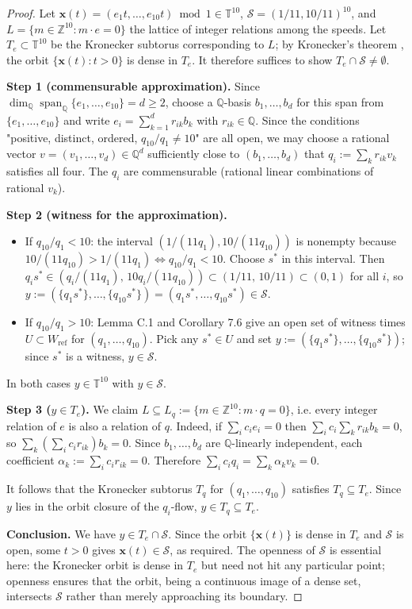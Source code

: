 \documentclass[12pt]{article}
\begin{document}
\begin{proof}
Let $\mathbf{x}(t)=(e_1t,\ldots,e_{10}t)\bmod 1\in\mathbb{T}^{10}$,
$\mathcal{S}=(1/11,10/11)^{10}$, and
$L=\{m\in\mathbb{Z}^{10}:m\cdot e=0\}$ the lattice of integer relations among the speeds.
Let $T_e\subset\mathbb{T}^{10}$ be the Kronecker subtorus corresponding to $L$; by
Kronecker's theorem \cite{KN74}, the orbit $\{\mathbf{x}(t):t>0\}$ is dense in $T_e$.
It therefore suffices to show $T_e\cap\mathcal{S}\ne\emptyset$.

\textbf{Step 1 (commensurable approximation).}
Since $\dim_{\mathbb{Q}}\operatorname{span}_{\mathbb{Q}}\{e_1,\ldots,e_{10}\}=d\ge 2$,
choose a $\mathbb{Q}$-basis $b_1,\ldots,b_d$ for this span from $\{e_1,\ldots,e_{10}\}$
and write $e_i=\sum_{k=1}^d r_{ik}b_k$ with $r_{ik}\in\mathbb{Q}$.
Since the conditions "positive, distinct, ordered, $q_{10}/q_1\ne 10$" are all open,
we may choose a rational vector $v=(v_1,\ldots,v_d)\in\mathbb{Q}^d$ sufficiently close
to $(b_1,\ldots,b_d)$ that $q_i:=\sum_k r_{ik}v_k$ satisfies all four. The $q_i$ are
commensurable (rational linear combinations of rational $v_k$).

\textbf{Step 2 (witness for the approximation).}
\begin{itemize}
\item If $q_{10}/q_1<10$: the interval $(1/(11q_1),10/(11q_{10}))$ is nonempty because
  $10/(11q_{10})>1/(11q_1)\iff q_{10}/q_1<10$. Choose $s^*$ in this interval. Then
  $q_is^*\in(q_i/(11q_1),\,10q_i/(11q_{10}))\subset(1/11,\,10/11)\subset(0,1)$ for
  all $i$, so $y:=(\{q_1s^*\},\ldots,\{q_{10}s^*\})=(q_1s^*,\ldots,q_{10}s^*)\in\mathcal{S}$.
\item If $q_{10}/q_1>10$: Lemma C.1 and Corollary 7.6 give an open set of witness times
  $U\subset W_{\mathrm{ref}}$ for $(q_1,\ldots,q_{10})$. Pick any $s^*\in U$ and set
  $y:=(\{q_1s^*\},\ldots,\{q_{10}s^*\})$; since $s^*$ is a witness, $y\in\mathcal{S}$.
\end{itemize}

In both cases $y\in\mathbb{T}^{10}$ with $y\in\mathcal{S}$.

\textbf{Step 3 ($y\in T_e$).}
We claim $L\subseteq L_q:=\{m\in\mathbb{Z}^{10}:m\cdot q=0\}$, i.e. every integer
relation of $e$ is also a relation of $q$. Indeed, if $\sum_i c_ie_i=0$ then
$\sum_i c_i\sum_k r_{ik}b_k=0$, so $\sum_k(\sum_i c_ir_{ik})b_k=0$. Since
$b_1,\ldots,b_d$ are $\mathbb{Q}$-linearly independent, each coefficient
$\alpha_k:=\sum_i c_ir_{ik}=0$. Therefore $\sum_i c_iq_i=\sum_k\alpha_kv_k=0$.

It follows that the Kronecker subtorus $T_q$ for $(q_1,\ldots,q_{10})$ satisfies
$T_q\subseteq T_e$. Since $y$ lies in the orbit closure of the $q_i$-flow,
$y\in T_q\subseteq T_e$.

\textbf{Conclusion.}
We have $y\in T_e\cap\mathcal{S}$. Since the orbit $\{\mathbf{x}(t)\}$ is dense in $T_e$
and $\mathcal{S}$ is open, some $t>0$ gives $\mathbf{x}(t)\in\mathcal{S}$, as required.
The openness of $\mathcal{S}$ is essential here: the Kronecker orbit is dense in $T_e$
but need not hit any particular point; openness ensures that the orbit, being a continuous
image of a dense set, intersects $\mathcal{S}$ rather than merely approaching its boundary.
\end{proof}
\end{document}
